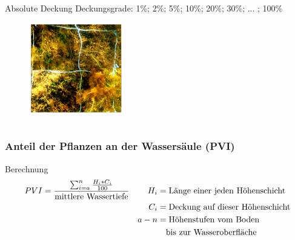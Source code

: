 \documentclass[xcolor=dvipsnames]{beamer}
\begin{document}
\begin{frame}
\begin{columns}
\begin{column}{5.5cm}
\begin{block}{Absolute Deckung}
Deckungsgrade: 
1\%; 2\%; 5\%; 10\%; 20\%; 30\%; ... ; 100\% 
\end{block}
\begin{figure}
\includegraphics[height=40mm]{images/plotpictures/V+M.png}
\end{figure}
\end{column}
\end{columns}
\end{frame}

\begin{frame}
\frametitle{Anteil der Pflanzen an der Wassersäule (PVI)}
\begin{block}{Berechnung}
\begin{align*}
 PVI &=\frac{\sum_{i=a}^n \frac{H_i * C_i}{100}}{\text{mittlere Wassertiefe}} & H_i &=\text{Länge einer jeden Höhenschicht}\\ 
 & & C_i &=\text{Deckung auf dieser Höhenschicht}\\
 & & a-n &=\text{Höhenstufen vom Boden}\\
 & &     &\text{\quad bis zur Wasseroberfläche}\\
\end{align*}
\end{block}
\end{frame}
\end{document}
